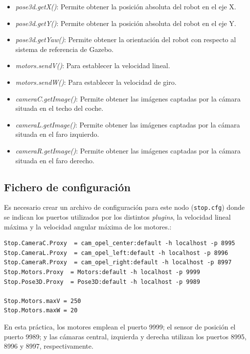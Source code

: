 \begin{itemize}
\item 	\textit{pose3d.getX()}: Permite obtener la posición absoluta del robot en el eje X.
\item	\textit{pose3d.getY()}: Permite obtener la posición absoluta del robot en el eje Y.
\item	\textit{pose3d.getYaw()}: Permite obtener la orientación del robot con respecto al sistema de referencia de Gazebo.
\item 	\textit{motors.sendV()}: Para establecer la velocidad lineal.
\item	\textit{motors.sendW()}: Para establecer la velocidad de giro.
\item	\textit{cameraC.getImage()}: Permite obtener las imágenes captadas por la cámara situada en el techo del coche.
\item	\textit{cameraL.getImage()}: Permite obtener las imágenes captadas por la cámara situada en el faro izquierdo.
\item	\textit{cameraR.getImage()}: Permite obtener las imágenes captadas por la cámara situada en el faro derecho.
\end{itemize}

\subsection{Fichero de configuración}
Es necesario crear un archivo de configuración para este nodo (\texttt{stop.cfg}) donde se indican los puertos utilizados por los distintos \textit{plugins}, la velocidad lineal máxima y la velocidad angular máxima de los motores.:

\vspace{20pt}
	\begin{lstlisting}[frame=single]
Stop.CameraC.Proxy  = cam_opel_center:default -h localhost -p 8995
Stop.CameraL.Proxy  = cam_opel_left:default -h localhost -p 8996
Stop.CameraR.Proxy  = cam_opel_right:default -h localhost -p 8997
Stop.Motors.Proxy  = Motors:default -h localhost -p 9999
Stop.Pose3D.Proxy  = Pose3D:default -h localhost -p 9989

Stop.Motors.maxV = 250
Stop.Motors.maxW = 20
	\end{lstlisting}

En esta práctica, los motores emplean el puerto 9999; el sensor de posición el puerto 9989; y las cámaras central, izquierda y derecha utilizan los puertos 8995, 8996 y 8997, respectivamente. \\



